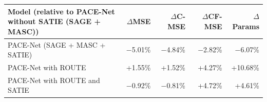 \begin{tabular}{p{4.3cm}rrrr}
\toprule
Model (relative to PACE-Net without SATIE (SAGE + MASC)) & $\Delta$MSE & $\Delta$C-MSE & $\Delta$CF-MSE & $\Delta$Params\\
\midrule
PACE-Net (SAGE + MASC + SATIE) & $-$5.01\% & $-$4.84\% & $-$2.82\% & $-$6.07\%\\
PACE-Net with ROUTE & +1.55\% & +1.52\% & +4.27\% & +10.68\%\\
PACE-Net with ROUTE and SATIE & $-$0.92\% & $-$0.81\% & +4.72\% & +4.61\%\\
\bottomrule
\end{tabular}
